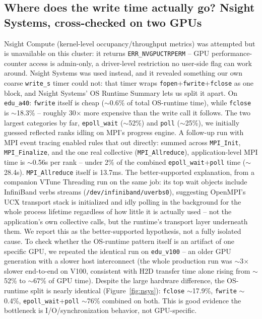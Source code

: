 \subsection{Where does the write time actually go? Nsight Systems, cross-checked on two GPUs}
\label{sec:nsys}
Nsight Compute (kernel-level occupancy/throughput metrics) was
attempted but is unavailable on this cluster: it returns
\texttt{ERR\_NVGPUCTRPERM} -- GPU performance-counter access is
admin-only, a driver-level restriction no user-side flag can work
around. Nsight Systems was used instead, and it revealed something our
own coarse \texttt{write\_s} timer could not: that timer wraps
\texttt{fopen}+\texttt{fwrite}+\texttt{fclose} as one block, and Nsight
Systems' OS Runtime Summary lets us split it apart. On \texttt{edu\_a40}:
\texttt{fwrite} itself is cheap ($\sim$0.6\% of total OS-runtime time),
while \texttt{fclose} is $\sim$18.3\% -- roughly 30$\times$ more
expensive than the write call it follows. The two largest categories by
far, \texttt{epoll\_wait} ($\sim$52\%) and \texttt{poll} ($\sim$25\%), we
initially guessed reflected ranks idling on MPI's progress engine. A
follow-up run with MPI event tracing enabled rules that out directly:
summed across \texttt{MPI\_Init}, \texttt{MPI\_Finalize}, and the one
real collective (\texttt{MPI\_Allreduce}), application-level MPI time is
$\sim$0.56s per rank -- under 2\% of the combined
\texttt{epoll\_wait}+\texttt{poll} time ($\sim$28.4s). \texttt{MPI\_Allreduce}
itself is 13.7ms. The better-supported explanation, from a companion
VTune Threading run on the same job: its top wait objects include
InfiniBand verbs streams (\texttt{/dev/infiniband/uverbs0}), suggesting
OpenMPI's UCX transport stack is initialized and idly polling in the
background for the whole process lifetime regardless of how little it is
actually used -- not the application's own collective calls, but the
runtime's transport layer underneath them. We report this as the
better-supported hypothesis, not a fully isolated cause. To check whether the OS-runtime pattern itself is an artifact of
one specific GPU, we repeated the identical run on \texttt{edu\_v100} --
an older GPU generation with a slower host interconnect (the whole
production run was $\sim$3$\times$ slower end-to-end on V100, consistent
with H2D transfer time alone rising from $\sim$52\% to $\sim$67\% of GPU
time). Despite the large hardware difference, the OS-runtime split is
nearly identical (Figure~\ref{fig:nsys}): \texttt{fclose} $\sim$17.9\%,
\texttt{fwrite} $\sim$0.4\%, \texttt{epoll\_wait}+\texttt{poll}
$\sim$76\% combined on both. This is good evidence the bottleneck is
I/O/synchronization behavior, not GPU-specific.


